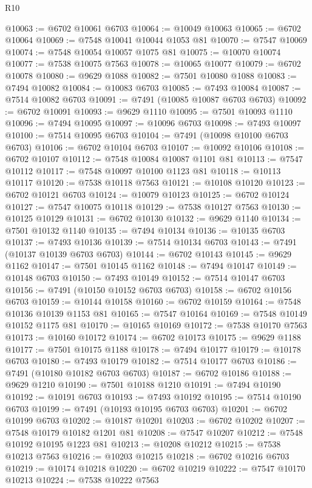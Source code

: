 \begin{lexlean}{R10}
\begin{coremodule}
{{{{{{{{{{{{{{{{{{{{{{{{{{{{{{{{{{{{{{{{{{{{{{{{{{{{{{{{{{{{{{{{{{{{{{{{{{{{{{{{{{{{@10063 := @6702 @10061 @6703
@10064 := @10049 @10063
@10065 := @6702 @10064
@10069 := @7548 @10041 @10044 @1053 @81
@10070 := @7547 @10069
@10074 := @7548 @10054 @10057 @1075 @81
@10075 := @10070 @10074
@10077 := @7538 @10075 @7563
@10078 := @10065 @10077
@10079 := @6702 @10078
@10080 := @9629 @1088
@10082 := @7501 @10080 @1088
@10083 := @7494 @10082
@10084 := @10083 @6703
@10085 := @7493 @10084
@10087 := @7514 @10082 @6703
@10091 := @7491 (@10085 @10087 @6703 @6703)
@10092 := @6702 @10091
@10093 := @9629 @1110
@10095 := @7501 @10093 @1110
@10096 := @7494 @10095
@10097 := @10096 @6703
@10098 := @7493 @10097
@10100 := @7514 @10095 @6703
@10104 := @7491 (@10098 @10100 @6703 @6703)
@10106 := @6702 @10104 @6703
@10107 := @10092 @10106
@10108 := @6702 @10107
@10112 := @7548 @10084 @10087 @1101 @81
@10113 := @7547 @10112
@10117 := @7548 @10097 @10100 @1123 @81
@10118 := @10113 @10117
@10120 := @7538 @10118 @7563
@10121 := @10108 @10120
@10123 := @6702 @10121 @6703
@10124 := @10079 @10123
@10125 := @6702 @10124
@10127 := @7547 @10075 @10118
@10129 := @7538 @10127 @7563
@10130 := @10125 @10129
@10131 := @6702 @10130
@10132 := @9629 @1140
@10134 := @7501 @10132 @1140
@10135 := @7494 @10134
@10136 := @10135 @6703
@10137 := @7493 @10136
@10139 := @7514 @10134 @6703
@10143 := @7491 (@10137 @10139 @6703 @6703)
@10144 := @6702 @10143
@10145 := @9629 @1162
@10147 := @7501 @10145 @1162
@10148 := @7494 @10147
@10149 := @10148 @6703
@10150 := @7493 @10149
@10152 := @7514 @10147 @6703
@10156 := @7491 (@10150 @10152 @6703 @6703)
@10158 := @6702 @10156 @6703
@10159 := @10144 @10158
@10160 := @6702 @10159
@10164 := @7548 @10136 @10139 @1153 @81
@10165 := @7547 @10164
@10169 := @7548 @10149 @10152 @1175 @81
@10170 := @10165 @10169
@10172 := @7538 @10170 @7563
@10173 := @10160 @10172
@10174 := @6702 @10173
@10175 := @9629 @1188
@10177 := @7501 @10175 @1188
@10178 := @7494 @10177
@10179 := @10178 @6703
@10180 := @7493 @10179
@10182 := @7514 @10177 @6703
@10186 := @7491 (@10180 @10182 @6703 @6703)
@10187 := @6702 @10186
@10188 := @9629 @1210
@10190 := @7501 @10188 @1210
@10191 := @7494 @10190
@10192 := @10191 @6703
@10193 := @7493 @10192
@10195 := @7514 @10190 @6703
@10199 := @7491 (@10193 @10195 @6703 @6703)
@10201 := @6702 @10199 @6703
@10202 := @10187 @10201
@10203 := @6702 @10202
@10207 := @7548 @10179 @10182 @1201 @81
@10208 := @7547 @10207
@10212 := @7548 @10192 @10195 @1223 @81
@10213 := @10208 @10212
@10215 := @7538 @10213 @7563
@10216 := @10203 @10215
@10218 := @6702 @10216 @6703
@10219 := @10174 @10218
@10220 := @6702 @10219
@10222 := @7547 @10170 @10213
@10224 := @7538 @10222 @7563
}}}}}}}}}}}}}}}}}}}}}}}}}}}}}}}}}}}}}}}}}}}}}}}}}}}}}}}}}}}}}}}}}}}}}}}}}}}}}}}}}}}}
\end{coremodule}
\end{lexlean}
